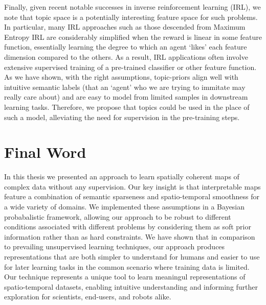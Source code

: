 Finally, given recent notable successes in inverse reinforcement learning (IRL), we note that topic space is a potentially interesting feature space for such problems. In particular, many IRL approaches such as those descended from Maximum Entropy IRL \citep{ziebart2008maximum} are considerably simplified when the reward is linear in some feature function, essentially learning the degree to which an agent `likes' each feature dimension compared to the others. As a result, IRL applications often involve extensive supervised training of a pre-trained classifier or other feature function. As we have shown, with the right assumptions, topic-priors align well with intuitive semantic labels (that an `agent' who we are trying to immitate may really care about) and are easy to model from limited samples in downstream learning tasks. Therefore, we propose that topics could be used in the place of such a model, alleviating the need for supervision in the pre-training steps.

\section{Final Word}
In this thesis we presented an approach to learn spatially coherent maps of complex data without any supervision. Our key insight is that interpretable maps feature a combination of semantic sparseness and spatio-temporal smoothness for a wide variety of domains. We implemented these assumptions in a Bayesian probabalistic framework, allowing our approach to be robust to different conditions associated with different problems by considering them as soft prior information rather than as hard constraints. We have shown that in comparison to prevailing unsupervised learning techniques, our approach produces representations that are both simpler to understand for humans and easier to use for later learning tasks in the common scenario where training data is limited. Our technique represents a unique tool to learn meaningul representations of spatio-temporal datasets, enabling intuitive understanding and informing further exploration for scientists, end-users, and robots alike.